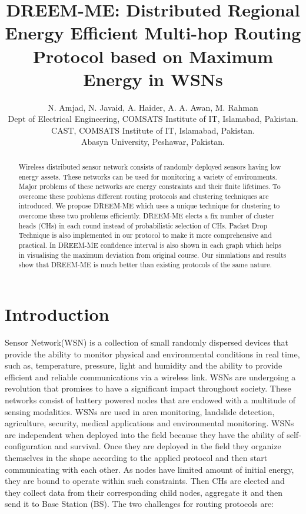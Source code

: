 \documentclass[journal]{IEEEtran}
\begin{document}
\title{DREEM-ME: Distributed Regional Energy Efficient Multi-hop Routing Protocol based on Maximum Energy in WSNs}

\author{N. Amjad, N. Javaid, A. Haider, A. A. Awan, M. Rahman\\\vspace{0.4cm}
Dept of Electrical Engineering, COMSATS Institute of IT, Islamabad, Pakistan.\\
CAST, COMSATS Institute of IT, Islamabad, Pakistan.\\
Abasyn University, Peshawar, Pakistan.}
\maketitle


\begin{abstract}
\boldmath
Wireless distributed sensor network consists of randomly deployed sensors having low energy assets. These networks can be used for monitoring a variety of environments. Major problems of these networks are energy constraints and their finite lifetimes. To overcome these problems different routing protocols and clustering techniques are introduced. We propose DREEM-ME which uses a unique technique for clustering to overcome these two problems efficiently. DREEM-ME elects a fix number of cluster heads (CHs) in each round instead of probabilistic selection of CHs. Packet Drop Technique is also implemented in our protocol to make it more comprehensive and practical. In DREEM-ME confidence interval is also shown in each graph which helps in visualising the maximum deviation from original course. Our simulations and results show that DREEM-ME is much better than existing protocols of the same nature.

\end{abstract}
\IEEEpeerreviewmaketitle

\section{Introduction}
 Sensor Network(WSN) is a collection of small randomly dispersed devices that provide the ability to monitor physical and environmental conditions in real time, such as, temperature, pressure, light and humidity and the ability to provide efficient and reliable communications via a wireless link. WSNs are undergoing a revolution that promises to have a significant impact throughout society. These networks consist of battery powered nodes that are endowed with a multitude of sensing modalities. WSNs are used in area monitoring, landslide detection, agriculture, security, medical applications and environmental monitoring.
 WSNs are independent when deployed into the field because they have the ability of self-configuration and survival. Once they are deployed in the field they organize themselves in the shape according to the applied protocol and then start communicating with each other. As nodes have limited amount of initial energy, they are bound to operate within such constraints. Then CHs are elected and they collect data from their corresponding child nodes, aggregate it and then send it to Base Station (BS). The two challenges for routing protocols are:
\end{document}
